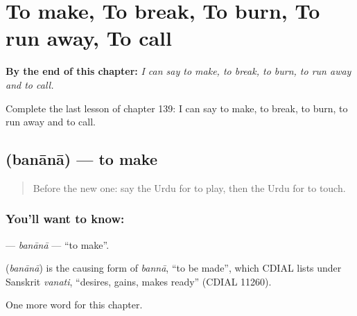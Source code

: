 
\chapter{To make, To break, To burn, To run away, To call}
\label{ch:ur-to-make-to-break-to-burn-to-run-away-to-call}

\begin{chapteropening}
\textbf{By the end of this chapter:} \emph{I can say to make, to break, to burn, to run away and to call.}

Complete the last lesson of chapter 139: I can say to make, to break, to burn, to run away and to call.
\end{chapteropening}

\section[\texorpdfstring{\ur{بنانا} (banānā)}{بنانا (banānā)}]{ (banānā) — to make}

\label{lesson:UR-C139-banana}



\begin{quote}
Before the new one: say the Urdu for to play, then the Urdu for to touch.
\end{quote}

\subsection*{You'll want to know: }
\textbf{} — \emph{banānā} — \textquotedblleft{}to make\textquotedblright{}.

\begin{cousinweb}
\textbf{} (\emph{banānā}) is the causing form of \emph{bannā}, \textquotedblleft{}to be made\textquotedblright{}, which CDIAL lists under Sanskrit \emph{vanati}, \textquotedblleft{}desires, gains, makes ready\textquotedblright{} (CDIAL 11260).
\end{cousinweb}

\begin{grammarlens}[title={What you've built}]
One more word for this chapter.
\end{grammarlens}

